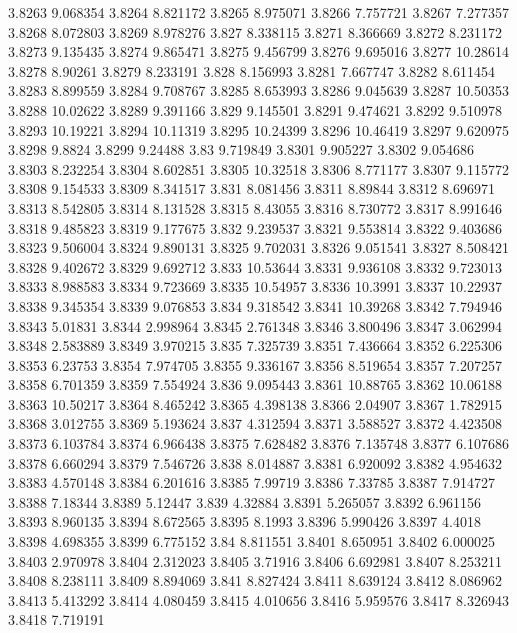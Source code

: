 3.8263  9.068354
3.8264  8.821172
3.8265  8.975071
3.8266  7.757721
3.8267  7.277357
3.8268  8.072803
3.8269  8.978276
3.827  8.338115
3.8271  8.366669
3.8272  8.231172
3.8273  9.135435
3.8274  9.865471
3.8275  9.456799
3.8276  9.695016
3.8277  10.28614
3.8278  8.90261
3.8279  8.233191
3.828  8.156993
3.8281  7.667747
3.8282  8.611454
3.8283  8.899559
3.8284  9.708767
3.8285  8.653993
3.8286  9.045639
3.8287  10.50353
3.8288  10.02622
3.8289  9.391166
3.829  9.145501
3.8291  9.474621
3.8292  9.510978
3.8293  10.19221
3.8294  10.11319
3.8295  10.24399
3.8296  10.46419
3.8297  9.620975
3.8298  9.8824
3.8299  9.24488
3.83  9.719849
3.8301  9.905227
3.8302  9.054686
3.8303  8.232254
3.8304  8.602851
3.8305  10.32518
3.8306  8.771177
3.8307  9.115772
3.8308  9.154533
3.8309  8.341517
3.831  8.081456
3.8311  8.89844
3.8312  8.696971
3.8313  8.542805
3.8314  8.131528
3.8315  8.43055
3.8316  8.730772
3.8317  8.991646
3.8318  9.485823
3.8319  9.177675
3.832  9.239537
3.8321  9.553814
3.8322  9.403686
3.8323  9.506004
3.8324  9.890131
3.8325  9.702031
3.8326  9.051541
3.8327  8.508421
3.8328  9.402672
3.8329  9.692712
3.833  10.53644
3.8331  9.936108
3.8332  9.723013
3.8333  8.988583
3.8334  9.723669
3.8335  10.54957
3.8336  10.3991
3.8337  10.22937
3.8338  9.345354
3.8339  9.076853
3.834  9.318542
3.8341  10.39268
3.8342  7.794946
3.8343  5.01831
3.8344  2.998964
3.8345  2.761348
3.8346  3.800496
3.8347  3.062994
3.8348  2.583889
3.8349  3.970215
3.835  7.325739
3.8351  7.436664
3.8352  6.225306
3.8353  6.23753
3.8354  7.974705
3.8355  9.336167
3.8356  8.519654
3.8357  7.207257
3.8358  6.701359
3.8359  7.554924
3.836  9.095443
3.8361  10.88765
3.8362  10.06188
3.8363  10.50217
3.8364  8.465242
3.8365  4.398138
3.8366  2.04907
3.8367  1.782915
3.8368  3.012755
3.8369  5.193624
3.837  4.312594
3.8371  3.588527
3.8372  4.423508
3.8373  6.103784
3.8374  6.966438
3.8375  7.628482
3.8376  7.135748
3.8377  6.107686
3.8378  6.660294
3.8379  7.546726
3.838  8.014887
3.8381  6.920092
3.8382  4.954632
3.8383  4.570148
3.8384  6.201616
3.8385  7.99719
3.8386  7.33785
3.8387  7.914727
3.8388  7.18344
3.8389  5.12447
3.839  4.32884
3.8391  5.265057
3.8392  6.961156
3.8393  8.960135
3.8394  8.672565
3.8395  8.1993
3.8396  5.990426
3.8397  4.4018
3.8398  4.698355
3.8399  6.775152
3.84  8.811551
3.8401  8.650951
3.8402  6.000025
3.8403  2.970978
3.8404  2.312023
3.8405  3.71916
3.8406  6.692981
3.8407  8.253211
3.8408  8.238111
3.8409  8.894069
3.841  8.827424
3.8411  8.639124
3.8412  8.086962
3.8413  5.413292
3.8414  4.080459
3.8415  4.010656
3.8416  5.959576
3.8417  8.326943
3.8418  7.719191
